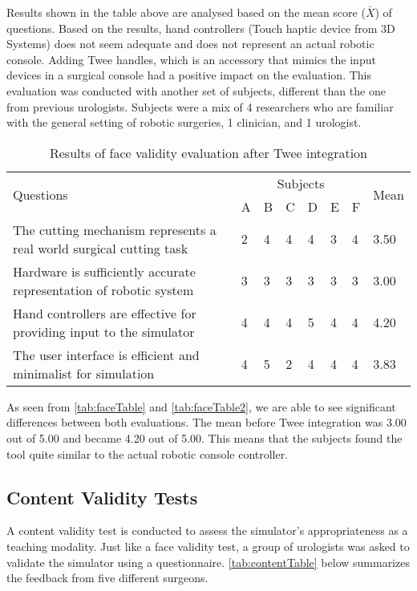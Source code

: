 Results shown in the table above are analysed based on the mean score ($\bar{X}$) of questions. Based on the results, hand controllers (Touch haptic device from 3D Systems) does not seem adequate and does not represent an actual robotic console. Adding Twee handles, which is an accessory that mimics the input devices in a surgical console had a positive impact on the evaluation. This evaluation was conducted with another set of subjects, different than the one from previous urologists. Subjects were a mix of 4 researchers who are familiar with the general setting of robotic surgeries, 1 clinician, and 1 urologist.


\begin{table}
\small
\centering
\begin{tabular}{p{6cm}p{0.5cm}p{0.5cm}p{0.5cm}p{0.5cm}p{0.5cm}p{0.5cm}p{0.8cm}}
  \multirow{2}{4em}{Questions} & \multicolumn{6}{c}{Subjects} & \multirow{2}{4em}{Mean}\\
  \cmidrule{2-7}
  & A & B & C & D & E & F &\\
  \toprule
  The cutting mechanism represents a real world surgical cutting task & 2& 4& 4& 4 & 3& 4 & 3.50\\
  \midrule
  Hardware is sufficiently accurate representation of robotic system
  & 3& 3& 3 & 3 & 3 & 3 & 3.00\\
  \midrule
  Hand controllers are effective for providing input to the simulator
  & 4 & 4 & 4& 5& 4 & 4 & 4.20\\
  \midrule
  The user interface is efficient and minimalist for simulation  & 4 & 5& 2 & 4 & 4& 4 & 3.83\\
  \bottomrule
\end{tabular}
\caption{Results of face validity evaluation after Twee integration}\label{tab:faceTable2}
\end{table}

As seen from \autoref{tab:faceTable} and \autoref{tab:faceTable2}, we are able to see significant differences between both evaluations. The mean before Twee integration was 3.00 out of 5.00 and became 4.20 out of 5.00. This means that the subjects found the tool quite similar to the actual robotic console controller.

\subsection{Content Validity Tests}\label{sec:content}
A content validity test is conducted to assess the simulator's appropriateness as a teaching modality. Just like a face validity test, a group of urologists was asked to validate the simulator using a questionnaire. \autoref{tab:contentTable} below summarizes the feedback from five different surgeons.

